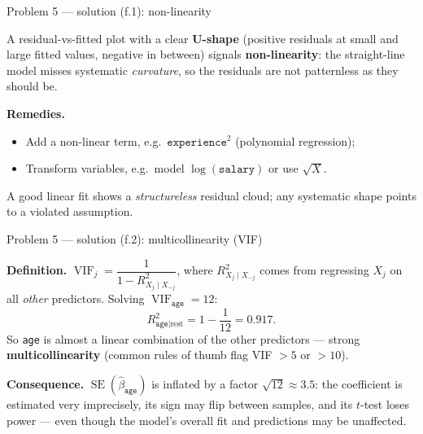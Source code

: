 \documentclass[aspectratio=169,11pt]{beamer}
\begin{document}
\begin{frame}{Problem 5 --- solution (f.1): non-linearity}
  \begin{solutionbox}
    A residual-vs-fitted plot with a clear \textbf{U-shape} (positive residuals at small and
    large fitted values, negative in between) signals \textbf{non-linearity}: the straight-line
    model misses systematic \emph{curvature}, so the residuals are not patternless as they should be.
    \medskip

    \textbf{Remedies.}
    \begin{itemize}
      \item Add a non-linear term, e.g.\ $\texttt{experience}^2$ (polynomial regression);
      \item Transform variables, e.g.\ model $\log(\texttt{salary})$ or use $\sqrt{X}$.
    \end{itemize}
  \end{solutionbox}
  \begin{takeaway}
    A good linear fit shows a \emph{structureless} residual cloud; any systematic shape points to
    a violated assumption.
  \end{takeaway}
\end{frame}

\begin{frame}{Problem 5 --- solution (f.2): multicollinearity (VIF)}
  \begin{solutionbox}[Solution P5(f)(ii) --- what {$\operatorname{VIF}=12$} means (part 2 of 2)]
    \textbf{Definition.} $\operatorname{VIF}_j=\dfrac{1}{1-R^2_{X_j\mid X_{-j}}}$, where
    $R^2_{X_j\mid X_{-j}}$ comes from regressing $X_j$ on all \emph{other} predictors. Solving
    $\operatorname{VIF}_{\texttt{age}}=12$:
    \[
      R^2_{\texttt{age}\mid \text{rest}}=1-\frac{1}{12}=0.917.
    \]
    So \texttt{age} is almost a linear combination of the other predictors --- strong
    \textbf{multicollinearity} (common rules of thumb flag VIF $>5$ or $>10$).
    \medskip

    \textbf{Consequence.} $\operatorname{SE}(\hat\beta_{\texttt{age}})$ is inflated by a factor
    $\sqrt{12}\approx 3.5$: the coefficient is estimated very imprecisely, its sign may flip
    between samples, and its $t$-test loses power --- even though the model's overall fit and
    predictions may be unaffected.
  \end{solutionbox}
\end{frame}
\end{document}
